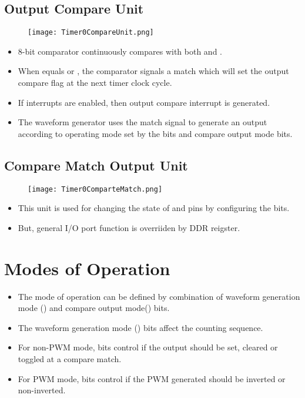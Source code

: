 \subsection{Output Compare Unit}
\begin{figure}[H]
    \begin{center}
        \texttt{[image: Timer0CompareUnit.png]}
    \end{center}
\end{figure}
\begin{itemize}
    \item 8-bit comparator continuously compares  with both  and .
    \item When  equals  or , the comparator signals a match which will set the output compare flag at the next timer clock cycle.
    \item If interrupts are enabled, then output compare interrupt is generated.
    \item The waveform generator uses the match signal to generate an output according to operating mode set by the  bits and compare output mode  bits.
\end{itemize}

\subsection{Compare Match Output Unit}
\begin{figure}[H]
    \begin{center}
        \texttt{[image: Timer0ComparteMatch.png]}
    \end{center}
\end{figure}
\begin{itemize}
    \item This unit is used for changing the state of  and  pins by configuring the  bits.
    \item But, general I/O port function is overriiden by DDR reigster.
\end{itemize}

\section{Modes of Operation}
\begin{itemize}
    \item The mode of operation can be defined by combination of waveform generation mode () and compare output mode() bits.
    \item The waveform generation mode () bits affect the counting sequence.
    \item For non-PWM mode,  bits control if the output should be set, cleared or toggled at a compare match.
    \item For PWM mode,  bits control if the PWM generated should be inverted or non-inverted.
\end{itemize}

